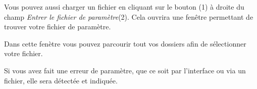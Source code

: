 \documentclass[a4paper,11pt]{article}
\begin{document}
\vspace{1.2cm}

Vous pouvez aussi charger un fichier en cliquant sur le bouton (1) à droite du champ \textit{Entrer le fichier de paramètre}(2). Cela ouvrira une fenêtre permettant de trouver votre fichier de paramètre.\\

\vspace{2.5cm}

Dans cette fenètre vous pouvez parcourir tout vos dossiers afin de sélectionner votre fichier.\\

\vspace{3.5cm}

Si vous avez fait une erreur de paramètre, que ce soit par l'interface ou via un fichier, elle sera détectée et indiquée.\\
\end{document}
